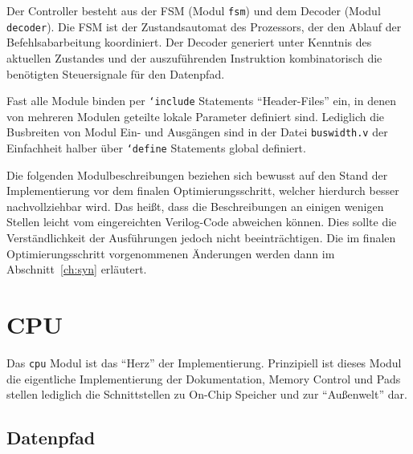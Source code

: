 \documentclass[ngerman, cd=lightcolor]{tudscrreprt}
\begin{document}
Der Controller besteht aus der FSM (Modul \texttt{fsm}) und dem Decoder (Modul
\texttt{decoder}). Die FSM ist der Zustandsautomat des Prozessors, der den
Ablauf der Befehlsabarbeitung koordiniert. Der Decoder generiert unter Kenntnis
des aktuellen Zustandes und der auszuführenden Instruktion kombinatorisch die
benötigten Steuersignale für den Datenpfad.

Fast alle Module binden per \texttt{`include} Statements ``Header-Files'' ein,
in denen von mehreren Modulen geteilte lokale Parameter definiert sind.
Lediglich die Busbreiten von Modul Ein- und Ausgängen sind in der Datei
\texttt{buswidth.v} der Einfachheit halber über \texttt{`define} Statements
global definiert.

Die folgenden Modulbeschreibungen beziehen sich bewusst auf den Stand der
Implementierung vor dem finalen Optimierungsschritt, welcher hierdurch besser
nachvollziehbar wird. Das heißt, dass die Beschreibungen an einigen wenigen
Stellen leicht vom eingereichten Verilog-Code abweichen können. Dies sollte die
Verständlichkeit der Ausführungen jedoch nicht beeinträchtigen. Die im finalen
Optimierungsschritt vorgenommenen Änderungen werden dann im
Abschnitt~\ref{ch:syn} erläutert.

\section{CPU}

Das \texttt{cpu} Modul ist das ``Herz'' der Implementierung. Prinzipiell ist
dieses Modul die eigentliche Implementierung der Dokumentation, Memory Control
und Pads stellen lediglich die Schnittstellen zu On-Chip Speicher und zur
``Außenwelt'' dar.

\subsection{Datenpfad}
\end{document}
